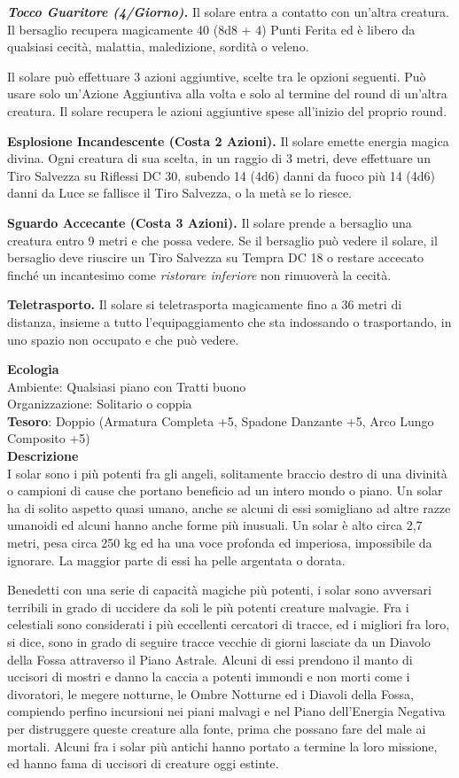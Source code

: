 \begin{multicols}{2}
	\textit{\textbf{Tocco Guaritore (4/Giorno).}} Il solare entra a contatto con un'altra creatura. Il bersaglio recupera magicamente 40 (8d8 + 4) Punti Ferita ed è libero da qualsiasi cecità, malattia, maledizione, sordità o veleno.

	Il solare può effettuare 3 azioni aggiuntive, scelte tra le opzioni seguenti. Può usare solo un'Azione Aggiuntiva alla volta e solo al termine del round di un'altra creatura. Il solare recupera le azioni aggiuntive spese all'inizio del proprio round.

	\textbf{Esplosione Incandescente (Costa 2 Azioni).} Il solare emette energia magica divina. Ogni creatura di sua scelta, in un raggio di 3 metri, deve effettuare un Tiro Salvezza su Riflessi DC 30, subendo 14 (4d6) danni da fuoco più 14 (4d6) danni da Luce se fallisce il Tiro Salvezza, o la metà se lo riesce.

	\textbf{Sguardo Accecante (Costa 3 Azioni).} Il solare prende a bersaglio una creatura entro 9 metri e che possa vedere. Se il bersaglio può vedere il solare, il bersaglio deve riuscire un Tiro Salvezza su Tempra DC 18 o restare accecato finché un incantesimo come \textit{ristorare inferiore} non rimuoverà la cecità.

	\textbf{Teletrasporto.} Il solare si teletrasporta magicamente fino a 36 metri di distanza, insieme a tutto l'equipaggiamento che sta indossando o trasportando, in uno spazio non occupato e che può vedere.

	\textbf{Ecologia}\\
	Ambiente: Qualsiasi piano con Tratti buono\\
	Organizzazione: Solitario o coppia\\
	\textbf{Tesoro}: Doppio (Armatura Completa +5, Spadone Danzante +5, Arco Lungo Composito +5)\\
	\textbf{Descrizione}\\
	I solar sono i più potenti fra gli angeli, solitamente braccio destro di una divinità o campioni di cause che portano beneficio ad un intero mondo o piano. Un solar ha di solito aspetto quasi umano, anche se alcuni di essi somigliano ad altre razze umanoidi ed alcuni hanno anche forme più inusuali. Un solar è alto circa 2,7 metri, pesa circa 250 kg ed ha una voce profonda ed imperiosa, impossibile da ignorare. La maggior parte di essi ha pelle argentata o dorata.

	Benedetti con una serie di capacità magiche più potenti, i solar sono avversari terribili in grado di uccidere da soli le più potenti creature malvagie. Fra i celestiali sono considerati i più eccellenti cercatori di tracce, ed i migliori fra loro, si dice, sono in grado di seguire tracce vecchie di giorni lasciate da un Diavolo della Fossa attraverso il Piano Astrale. Alcuni di essi prendono il manto di uccisori di mostri e danno la caccia a potenti immondi e non morti come i divoratori, le megere notturne, le Ombre Notturne ed i Diavoli della Fossa, compiendo perfino incursioni nei piani malvagi e nel Piano dell'Energia Negativa per distruggere queste creature alla fonte, prima che possano fare del male ai mortali. Alcuni fra i solar più antichi hanno portato a termine la loro missione, ed hanno fama di uccisori di creature oggi estinte.


\end{multicols}
